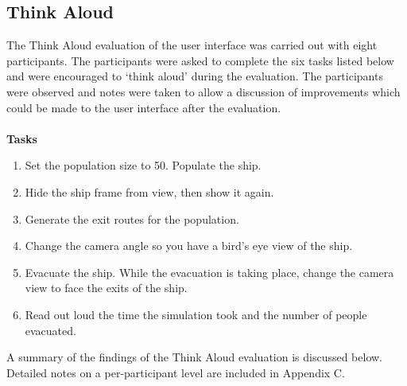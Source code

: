 \subsection{Think Aloud}
The Think Aloud evaluation of the user interface was carried out with eight participants. The participants were asked to complete the six tasks listed below and were encouraged to ‘think aloud’ during the evaluation. The participants were observed and notes were taken to allow a discussion of improvements which could be made to the user interface after the evaluation.
\\
\\
\textbf{Tasks}
\begin{enumerate}
\item Set the population size to 50. Populate the ship.
\item Hide the ship frame from view, then show it again.
\item Generate the exit routes for the population.
\item Change the camera angle so you have a bird's eye view of the ship.
\item Evacuate the ship. While the evacuation is taking place, change the camera view to face the exits of the ship.
\item Read out loud the time the simulation took and the number of people evacuated.
\end{enumerate}
A summary of the findings of the Think Aloud evaluation is discussed below. Detailed notes on a per-participant level are included in Appendix C.


